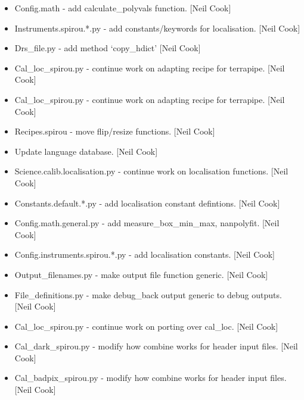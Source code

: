 \documentclass[a4paper,10pt,english]{report}
\begin{document}
\begin{itemize}
\item {} 
Config.math - add calculate\_polyvals function. {[}Neil Cook{]}

\item {} 
Instruments.spirou.*.py - add constants/keywords for localisation.
{[}Neil Cook{]}

\item {} 
Drs\_file.py - add method ‘copy\_hdict’ {[}Neil Cook{]}

\item {} 
Cal\_loc\_spirou.py - continue work on adapting recipe for terrapipe.
{[}Neil Cook{]}

\item {} 
Cal\_loc\_spirou.py - continue work on adapting recipe for terrapipe.
{[}Neil Cook{]}

\item {} 
Recipes.spirou - move flip/resize functions. {[}Neil Cook{]}

\item {} 
Update language database. {[}Neil Cook{]}

\item {} 
Science.calib.localisation.py - continue work on localisation
functions. {[}Neil Cook{]}

\item {} 
Constants.default.*.py - add localisation constant defintions. {[}Neil
Cook{]}

\item {} 
Config.math.general.py - add measure\_box\_min\_max, nanpolyfit. {[}Neil
Cook{]}

\item {} 
Config.instruments.spirou.*.py - add localisation constants. {[}Neil
Cook{]}

\item {} 
Output\_filenames.py - make output file function generic. {[}Neil Cook{]}

\item {} 
File\_definitions.py - make debug\_back output generic to debug outputs.
{[}Neil Cook{]}

\item {} 
Cal\_loc\_spirou.py - continue work on porting over cal\_loc. {[}Neil Cook{]}

\item {} 
Cal\_dark\_spirou.py - modify how combine works for header input files.
{[}Neil Cook{]}

\item {} 
Cal\_badpix\_spirou.py - modify how combine works for header input
files. {[}Neil Cook{]}


\end{itemize}
\end{document}
